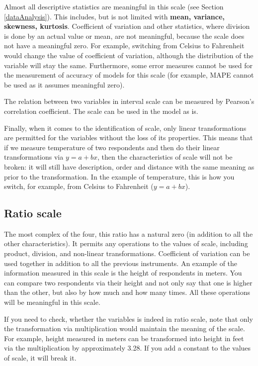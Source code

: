 \documentclass[
]{book}
\theoremstyle{definition}
\theoremstyle{definition}
\theoremstyle{definition}
\theoremstyle{definition}
\theoremstyle{remark}
\begin{document}
Almost all descriptive statistics are meaningful in this scale (see Section \ref{dataAnalysis}). This includes, but is not limited with \textbf{mean, variance, skewness, kurtosis}. Coefficient of variation and other statistics, where division is done by an actual value or mean, are not meaningful, because the scale does not have a meaningful zero. For example, switching from Celsius to Fahrenheit would change the value of coefficient of variation, although the distribution of the variable will stay the same. Furthermore, some error measures \citep[see Chapter 2 of][]{SvetunkovADAM} cannot be used for the measurement of accuracy of models for this scale (for example, MAPE cannot be used as it assumes meaningful zero).

The relation between two variables in interval scale can be measured by Pearson's correlation coefficient. The scale can be used in the model as is.

Finally, when it comes to the identification of scale, only linear transformations are permitted for the variables without the loss of its properties. This means that if we measure temperature of two respondents and then do their linear transformations via \(y=a+bx\), then the characteristics of scale will not be broken: it will still have description, order and distance with the same meaning as prior to the transformation. In the example of temperature, this is how you switch, for example, from Celsius to Fahrenheit (\(y=a+bx\)).

\subsection{Ratio scale}\label{ratio-scale}

The most complex of the four, this ratio has a natural zero (in addition to all the other characteristics). It permits any operations to the values of scale, including product, division, and non-linear transformations. Coefficient of variation can be used together in addition to all the previous instruments. An example of the information measured in this scale is the height of respondents in meters. You can compare two respondents via their height and not only say that one is higher than the other, but also by how much and how many times. All these operations will be meaningful in this scale.

If you need to check, whether the variables is indeed in ratio scale, note that only the transformation via multiplication would maintain the meaning of the scale. For example, height measured in meters can be transformed into height in feet via the multiplication by approximately 3.28. If you add a constant to the values of scale, it will break it.
\end{document}
